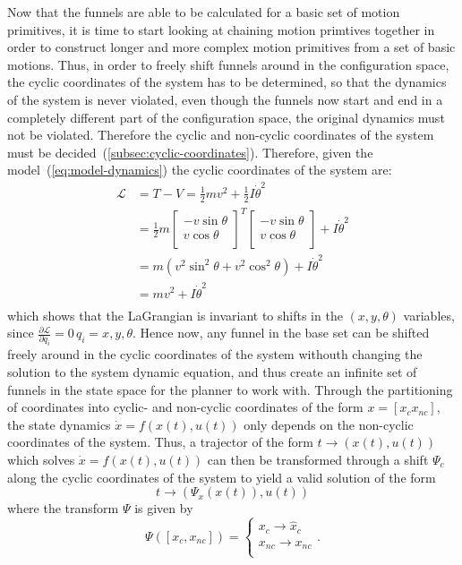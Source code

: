 Now that the funnels are able to be calculated for a basic set of motion
primitives, it is time to start looking at chaining motion primtives together in
order to construct longer and more complex motion primitives from a set of basic
motions. Thus, in order to freely shift funnels around in the configuration
space, the cyclic coordinates of the system has to be determined, so that the
dynamics of the system is never violated, even though the funnels now start and
end in a completely different part of the configuration space, the original
dynamics must not be violated. Therefore the cyclic and non-cyclic coordinates
of the system must be decided~(\ref{subsec:cyclic-coordinates}). Therefore,
given the model~(\ref{eq:model-dynamics}) the cyclic coordinates of the system
are:
\begin{align}
  \mathcal{L} &= T - V = \frac{1}{2} mv^2 + \frac{1}{2}I\dot{\theta}^2 \\ 
              &= \frac{1}{2} 
                m\begin{bmatrix}
                  -v\sin \theta \\ 
                  v \cos \theta \\
                \end{bmatrix}^{T}
  \begin{bmatrix}
    -v\sin \theta \\
    v \cos \theta \\
  \end{bmatrix}
  + I\dot{\theta}^2 \\
              &= m \left(
                v^2 \sin^2 \theta + v^2 \cos^2 \theta
                \right)  + I {\dot{\theta}}^2 \\
              &= mv^2 + I {\dot{\theta}}^2 \\
\end{align}
which shows that the LaGrangian is invariant to shifts in the \((x,y,\theta)\)
variables, since \(\frac{\partial\mathcal{L}}{\partial q_i} = 0 \, q_i =
x,y,\theta\). Hence now, any funnel in the base set can be shifted freely around
in the cyclic coordinates of the system withouth changing the solution to the
system dynamic equation, and thus create an infinite set of funnels in the state
space for the planner to work with. Through the partitioning of coordinates into
cyclic- and non-cyclic coordinates of the form \(x = [x_c x_{nc}]\), the state
dynamics \(\dot{x} = f(x(t), u(t))\) only depends on the non-cyclic coordinates
of the system. Thus, a trajector of the form \(t \rightarrow (x(t),u(t))\) which
solves \(\dot{x} = f(x(t),u(t))\) can then be transformed through a shift
\(\Psi_c\) along the cyclic coordinates of the system to yield a valid solution
of the form
\[
  t \rightarrow (\Psi_{x}(x(t)), u(t))
\]
where the transform \(\Psi\) is given by
\[
  \Psi([x_c, x_{nc}]) =  
  \begin{cases}
    x_c \rightarrow \hat{x}_{c} \\
    x_{nc} \rightarrow x_{nc} \\
  \end{cases}.
\]

